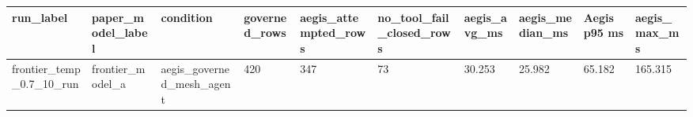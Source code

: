 \begin{tabular}{llllllllll}
 \hline
run\_label & paper\_model\_label & condition & governed\_rows & aegis\_attempted\_rows & no\_tool\_fail\_closed\_rows & aegis\_avg\_ms & aegis\_median\_ms & Aegis p95 ms & aegis\_max\_ms \\
 \hline
frontier\_temp\_0.7\_10\_run & frontier\_model\_a & aegis\_governed\_mesh\_agent & 420 & 347 & 73 & 30.253 & 25.982 & 65.182 & 165.315 \\
 \hline
\end{tabular}
